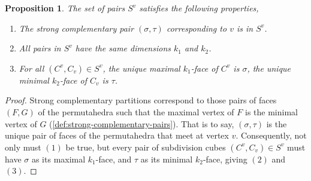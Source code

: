 \documentclass{amsart}
\newtheorem{proposition}[theorem]{Proposition}
\theoremstyle{definition}
\newcommand{\subdivpairsv}{S^v}
\begin{document}
\begin{proposition}\label{prop:ev properties}
The set of pairs $\subdivpairsv$ satisfies the following properties,
\begin{enumerate}
    \item The strong complementary pair $(\sigma,\tau)$ corresponding to $v$ is in $\subdivpairsv$.
    \item All pairs in $\subdivpairsv$ have the same dimensions $k_1$ and $k_2$.
    \item For all $(C^v,C_v) \in \subdivpairsv$, the unique maximal $k_1$-face of $C^v$ is $\sigma$, the unique minimal $k_2$-face of $C_v$ is $\tau$.
\end{enumerate}
\end{proposition}
\begin{proof}
Strong complementary partitions correspond to those pairs of faces $(F,G)$ of the permutahedra such that the maximal vertex of $F$ is the minimal vertex of $G$ (\cref{def:strong-complementary-pairs}).
That is to say, $(\sigma,\tau)$ is the unique pair of faces of the permutahedra that meet at vertex $v$.
Consequently, not only must $(1)$ be true, but every pair of subdivision cubes $(C^v,C_v) \in \subdivpairsv$ must have $\sigma$ as its maximal $k_1$-face, and $\tau$ as its minimal $k_2$-face, giving $(2)$ and $(3)$.
\end{proof}
\end{document}
